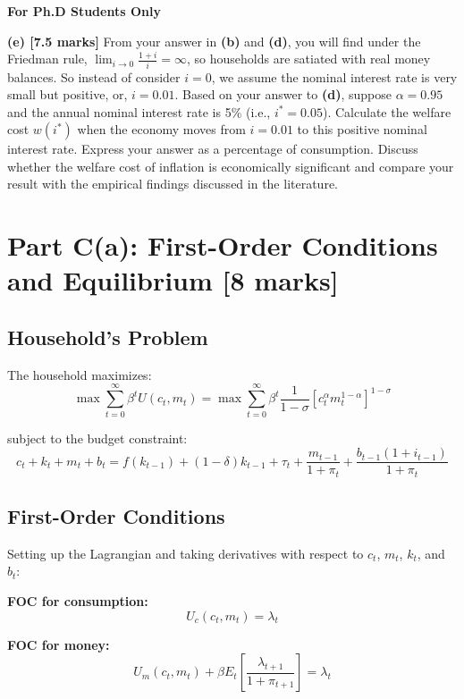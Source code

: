 \textbf{For Ph.D Students Only}
%
\vspace{0.3cm}

\noindent\textbf{(e) [7.5 marks]} From your answer in \textbf{(b)} and \textbf{(d)}, you will find under the Friedman rule, $\lim_{i \to 0} \frac{1+i}{i} = \infty$, so households are satiated with real money balances. So instead of consider $i=0$, we assume the nominal interest rate is very small but positive, or, $i=0.01$. Based on your answer to  \textbf{(d)}, suppose $\alpha = 0.95$ and the annual nominal interest rate is 5\% (i.e., $i^* = 0.05$). Calculate the welfare cost $w(i^*)$ when the economy moves from $i=0.01$ to this positive nominal interest rate. Express your answer as a percentage of consumption. Discuss whether the welfare cost of inflation is economically significant and compare your result with the empirical findings discussed in the literature.


\section*{Part C(a): First-Order Conditions and Equilibrium [8 marks]}

\subsection*{Household's Problem}
The household maximizes:
\begin{equation}
\max \sum_{t=0}^{\infty} \beta^t U(c_t, m_t) = \max \sum_{t=0}^{\infty} \beta^t \frac{1}{1-\sigma}[c_t^\alpha m_t^{1-\alpha}]^{1-\sigma}
\end{equation}

subject to the budget constraint:
\begin{equation}
c_t + k_t + m_t + b_t = f(k_{t-1}) + (1-\delta)k_{t-1} + \tau_t + \frac{m_{t-1}}{1+\pi_t} + \frac{b_{t-1}(1+i_{t-1})}{1+\pi_t}
\end{equation}

\subsection*{First-Order Conditions}
Setting up the Lagrangian and taking derivatives with respect to $c_t$, $m_t$, $k_t$, and $b_t$:

\textbf{FOC for consumption:}
\begin{equation}
U_c(c_t, m_t) = \lambda_t
\end{equation}

\textbf{FOC for money:}
\begin{equation}
U_m(c_t, m_t) + \beta E_t\left[\frac{\lambda_{t+1}}{1+\pi_{t+1}}\right] = \lambda_t
\end{equation}

